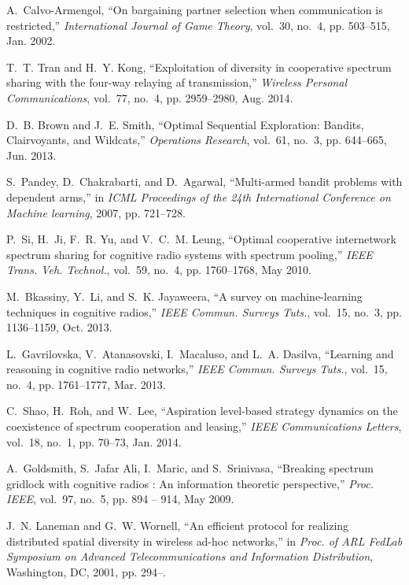 \begin{thebibliography}{}
A.~Calvo-Armengol, ``On bargaining partner selection when communication is
  restricted,'' \emph{International Journal of Game Theory}, vol.~30, no.~4,
  pp. 503--515, Jan. 2002.

T.~T. Tran and H.~Y. Kong, ``Exploitation of diversity in cooperative spectrum
  sharing with the four-way relaying af transmission,'' \emph{Wireless Personal
  Communications}, vol.~77, no.~4, pp. 2959--2980, Aug. 2014.

D.~B. Brown and J.~E. Smith, ``{Optimal Sequential Exploration: Bandits,
  Clairvoyants, and Wildcats},'' \emph{Operations Research}, vol.~61, no.~3,
  pp. 644--665, Jun. 2013.

S.~Pandey, D.~Chakrabarti, and D.~Agarwal, ``Multi-armed bandit problems with
  dependent arms,'' in \emph{{ICML} Proceedings of the 24th International
  Conference on Machine learning}, 2007, pp. 721--728.

P.~Si, H.~Ji, F.~R. Yu, and V.~C.~M. Leung, ``Optimal cooperative internetwork
  spectrum sharing for cognitive radio systems with spectrum pooling,''
  \emph{{IEEE} Trans. Veh. Technol.}, vol.~59, no.~4, pp. 1760--1768, May 2010.

M.~Bkassiny, Y.~Li, and S.~K. Jayaweera, ``A survey on machine-learning
  techniques in cognitive radios,'' \emph{{IEEE} Commun. Surveys Tuts.},
  vol.~15, no.~3, pp. 1136--1159, Oct. 2013.

L.~Gavrilovska, V.~Atanasovski, I.~Macaluso, and L.~A. Dasilva, ``Learning and
  reasoning in cognitive radio networks,'' \emph{{IEEE} Commun. Surveys Tuts.},
  vol.~15, no.~4, pp. 1761--1777, Mar. 2013.

C.~Shao, H.~Roh, and W.~Lee, ``Aspiration level-based strategy dynamics on the
  coexistence of spectrum cooperation and leasing,'' \emph{{IEEE}
  Communications Letters}, vol.~18, no.~1, pp. 70--73, Jan. 2014.

A.~Goldsmith, S.~{Jafar Ali}, I.~Maric, and S.~Srinivasa, ``Breaking spectrum
  gridlock with cognitive radios : An information theoretic perspective,''
  \emph{Proc. {IEEE}}, vol.~97, no.~5, pp. 894 -- 914, May 2009.

J.~N. Laneman and G.~W. Wornell, ``An efficient protocol for realizing
  distributed spatial diversity in wireless ad-hoc networks,'' in \emph{Proc.
  of ARL FedLab Symposium on Advanced Telecommunications and Information
  Distribution}, Washington, DC, 2001, pp. 294--.


\end{thebibliography}

